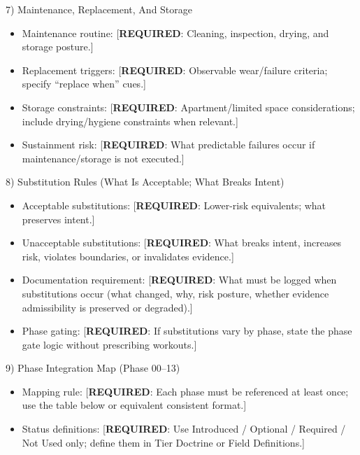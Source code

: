 \documentclass[10pt]{article}
\begin{document}
7) Maintenance, Replacement, And Storage

\begin{itemize}
\item Maintenance routine: [\textbf{REQUIRED}: Cleaning, inspection, drying, and storage posture.]
\item Replacement triggers: [\textbf{REQUIRED}: Observable wear/failure criteria; specify “replace when” cues.]
\item Storage constraints: [\textbf{REQUIRED}: Apartment/limited space considerations; include drying/hygiene constraints when relevant.]
\item Sustainment risk: [\textbf{REQUIRED}: What predictable failures occur if maintenance/storage is not executed.]
\end{itemize}

8) Substitution Rules (What Is Acceptable; What Breaks Intent)

\begin{itemize}
\item Acceptable substitutions: [\textbf{REQUIRED}: Lower-risk equivalents; what preserves intent.]
\item Unacceptable substitutions: [\textbf{REQUIRED}: What breaks intent, increases risk, violates boundaries, or invalidates evidence.]
\item Documentation requirement: [\textbf{REQUIRED}: What must be logged when substitutions occur (what changed, why, risk posture, whether evidence admissibility is preserved or degraded).]
\item Phase gating: [\textbf{REQUIRED}: If substitutions vary by phase, state the phase gate logic without prescribing workouts.]
\end{itemize}

9) Phase Integration Map (Phase 00–13)

\begin{itemize}
\item Mapping rule: [\textbf{REQUIRED}: Each phase must be referenced at least once; use the table below or equivalent consistent format.]
\item Status definitions: [\textbf{REQUIRED}: Use Introduced / Optional / Required / Not Used only; define them in Tier Doctrine or Field Definitions.]
\end{itemize}
\end{document}
